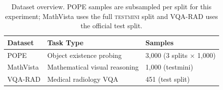 \begin{table}[htbp]
  \centering
  \caption{Dataset overview.
    POPE samples are subsampled
    per split for this experiment;
    MathVista uses the full \textsc{testmini} split
    and VQA-RAD uses the official test split.}
  \label{tab:dataset_overview}
  \begin{tabular}{lll}
    \toprule
    Dataset   & Task Type                      & Samples \\
    \midrule
    POPE \citep{liEvaluatingObjectHallucination2023}
      & Object existence probing        & 3{,}000 (3 splits $\times$ 1{,}000) \\
    MathVista \citep{luMathVistaEvaluatingMathematical2024}
      & Mathematical visual reasoning   & 1{,}000 (testmini) \\
    VQA-RAD \citep{lauDatasetClinicallyGenerated2018}
      & Medical radiology VQA           & 451 (test split) \\
    \bottomrule
  \end{tabular}
\end{table}
